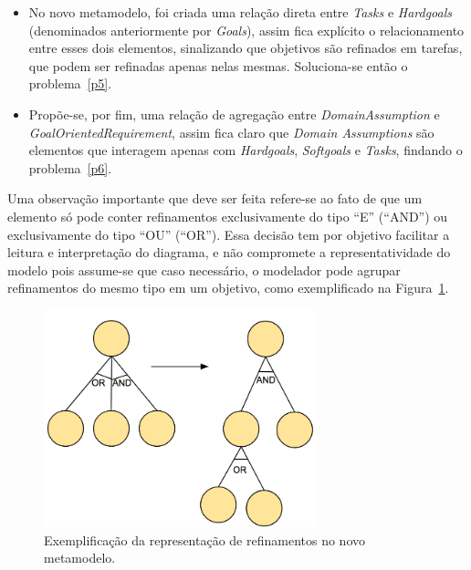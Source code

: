 \begin{itemize}
	
	\item No novo metamodelo, foi criada uma relação direta entre \textit{Tasks} e \textit{Hardgoals} (denominados anteriormente por \textit{Goals}), assim fica explícito o relacionamento entre esses dois elementos, sinalizando que objetivos são refinados em tarefas, que podem ser refinadas apenas nelas mesmas. Soluciona-se então o problema~\ref{p5}.
	
	\item Propõe-se, por fim, uma relação de agregação entre \textit{DomainAssumption} e \textit{GoalOrientedRequirement}, assim fica claro que \textit{Domain Assumptions} são elementos que interagem apenas com \textit{Hardgoals}, \textit{Softgoals} e \textit{Tasks}, findando o problema~\ref{p6}.
	
\end{itemize}

Uma observação importante que deve ser feita refere-se ao fato de que um elemento só pode conter refinamentos exclusivamente do tipo ``E'' (``AND'') ou exclusivamente do tipo ``OU'' (``OR''). Essa decisão tem por objetivo facilitar a leitura e interpretação do diagrama, e não compromete a representatividade do modelo pois assume-se que caso necessário, o modelador pode agrupar refinamentos do mesmo tipo em um objetivo, como exemplificado na Figura~\ref{figura-refinamentos}.

\begin{figure}
	\centering
	\includegraphics[width=0.7\textwidth]{figuras/metamodelos/exemplo-or-and.png}
	\caption{Exemplificação da representação de refinamentos no novo metamodelo.}
	\label{figura-refinamentos}
\end{figure}


